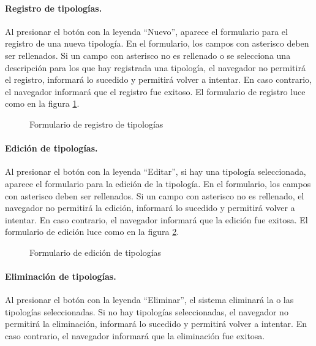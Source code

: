 \documentclass[a4paper, 9pt, conference]{article}              %
\begin{document}
\paragraph{Registro de tipolog\'ias.}

Al presionar el bot\'on con la leyenda ``Nuevo'', aparece el formulario para el registro de una nueva tipolog\'ia. En el formulario, los campos con asterisco deben ser rellenados. Si un campo con asterisco no es rellenado o se selecciona una descripci\'on para los que hay registrada una tipolog\'ia, el navegador no permitir\'a el registro, informar\'a lo sucedido y permitir\'a volver a intentar. En caso contrario, el navegador informar\'a que el registro fue exitoso. El formulario de registro luce como en la figura \ref{fig:geotypologiesnew}.

\begin{figure}
	\centering
		\caption{Formulario de registro de tipolog\'ias}
	\label{fig:geotypologiesnew}
\end{figure}

\paragraph{Edici\'on de tipolog\'ias.}

Al presionar el bot\'on con la leyenda ``Editar'', si hay una tipolog\'ia seleccionada, aparece el formulario para la edici\'on de la tipolog\'ia. En el formulario, los campos con asterisco deben ser rellenados. Si un campo con asterisco no es rellenado, el navegador no permitir\'a la edici\'on, informar\'a lo sucedido y permitir\'a volver a intentar. En caso contrario, el navegador informar\'a que la edici\'on fue exitosa. El formulario de edici\'on luce como en la figura \ref{fig:geotypologiesedit}.

\begin{figure}
	\centering
		\caption{Formulario de edici\'on de tipolog\'ias}
	\label{fig:geotypologiesedit}
\end{figure}

\paragraph{Eliminaci\'on de tipolog\'ias.}

Al presionar el bot\'on con la leyenda ``Eliminar'', el sistema eliminar\'a la o las tipolog\'ias seleccionadas. Si no hay tipolog\'ias seleccionadas, el navegador no permitir\'a la eliminaci\'on, informar\'a lo sucedido y permitir\'a volver a intentar. En caso contrario, el navegador informar\'a que la eliminaci\'on fue exitosa.
\end{document}

